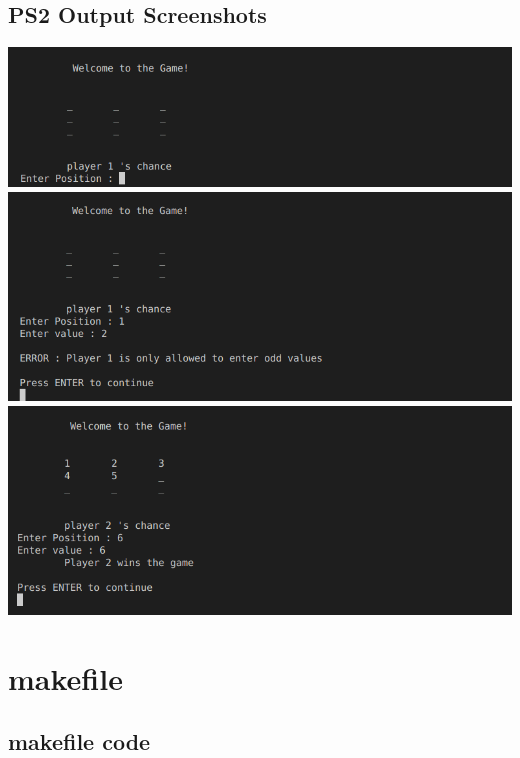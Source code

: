 \documentclass{article}
\begin{document}
    \subsection{PS2 Output Screenshots}
    \includegraphics[width=1.2\textwidth]{./images/ps2_001.png}
    \includegraphics[width=1.2\textwidth]{./images/ps2_002.png}
    \includegraphics[width=1.2\textwidth]{./images/ps2_003.png}
    \section{makefile}
    \subsection{makefile code}
    
\end{document}
